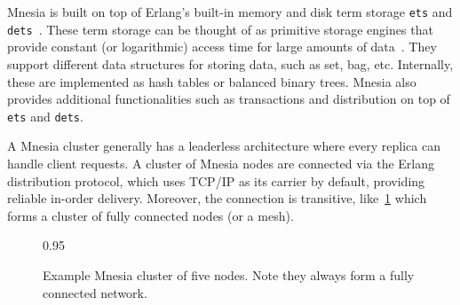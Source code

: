 Mnesia is built on top of Erlang's built-in memory and disk term storage
\texttt{ets} and \texttt{dets}~\cite{ericssonab2023stdlib}.  These term storage
can be thought of as primitive storage engines that provide constant (or
logarithmic) access time for large amounts of data~\cite{hebert2013LYSE}.
They support different data structures for storing data, such as set, 
bag, etc.  Internally, these are implemented as hash tables or balanced binary trees.
Mnesia also provides additional functionalities such as transactions and 
distribution on top of \texttt{ets} and \texttt{dets}.

A Mnesia cluster generally has a leaderless architecture where every replica can 
handle client requests. A cluster of Mnesia nodes are connected via the
Erlang distribution protocol, which uses TCP/IP as its carrier by default, providing
reliable in-order delivery. Moreover, the connection is transitive, 
like~\cref{fig:example mnesia cluster} which forms a cluster of fully connected
nodes (or a mesh).



\begin{figure}[htp]{0.95\textwidth}
  \caption{Example Mnesia cluster of five nodes. Note they always form a
  fully connected network.}
  \label{fig:example mnesia cluster}
\end{figure}


